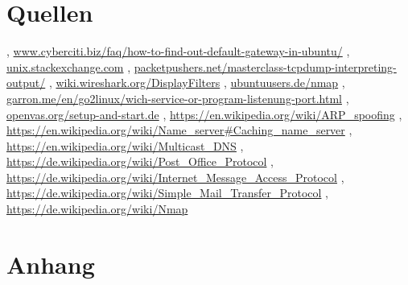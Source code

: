 \documentclass[12pt]{article}
\theoremstyle{plain}
\begin{document}
\section{Quellen}
\begin{thebibliography}{50}
\bibitem  [Cyberciti], \url{www.cyberciti.biz/faq/how-to-find-out-default-gateway-in-ubuntu/}
\bibitem [Stackexchange] , \url{unix.stackexchange.com}
\bibitem [Tcpdump], \url{packetpushers.net/masterclass-tcpdump-interpreting-output/}
\bibitem [Wireshark], \url{wiki.wireshark.org/DisplayFilters}
\bibitem [Nmap 1], \url{ubuntuusers.de/nmap}
\bibitem [Nmap 2], \url{garron.me/en/go2linux/wich-service-or-program-listenung-port.html}
\bibitem [OpenVAS], \url{openvas.org/setup-and-start.de}
, \url{https://en.wikipedia.org/wiki/ARP_spoofing}
\bibitem [DNS], \url{https://en.wikipedia.org/wiki/Name_server#Caching_name_server}
\bibitem [DNS 2], \url{https://en.wikipedia.org/wiki/Multicast_DNS}
\bibitem [POP], \url{https://de.wikipedia.org/wiki/Post_Office_Protocol}
\bibitem [IMAP], \url{https://de.wikipedia.org/wiki/Internet_Message_Access_Protocol}
\bibitem [SMTP], \url{https://de.wikipedia.org/wiki/Simple_Mail_Transfer_Protocol}
\bibitem [Nmap 3], \url{https://de.wikipedia.org/wiki/Nmap}	
\end{thebibliography}
\section{Anhang}
\end{document}
